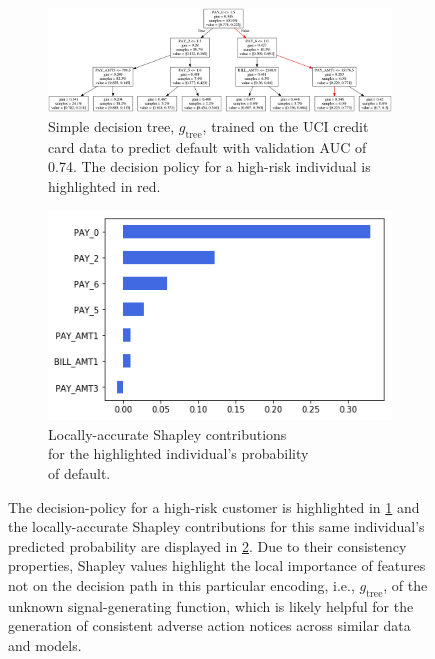 \documentclass{article}
\begin{document}
\begin{figure}[ht!]
	\begin{subfigure}{.6\textwidth}
		\includegraphics[height=.45\linewidth, width=1.15\linewidth]{img/dt.png}
  		\caption{Simple decision tree, $g_{\text{tree}}$, trained on the UCI credit card data to predict default with validation AUC of 0.74. The decision policy for a high-risk individual is highlighted in red.}
  		\label{fig:dt}
	\end{subfigure}\hspace{50pt}
	\begin{subfigure}{.4\textwidth}
		\vspace{22pt}
  		\includegraphics[height=.5\linewidth, width=.8\linewidth]{img/shap.png}
  		\vspace{5pt}
  		\caption{Locally-accurate Shapley contributions\\ for the highlighted individual's probability\\ of default.}
  		\label{fig:shap}
	\end{subfigure}
	\caption{The decision-policy for a high-risk customer is highlighted in \ref{fig:dt} and the locally-accurate Shapley contributions for this same individual's predicted probability are displayed in \ref{fig:shap}. Due to their consistency properties, Shapley values highlight the local importance of features not on the decision path in this particular encoding, i.e., $g_{\text{tree}}$, of the unknown signal-generating function, which is likely helpful for the generation of consistent adverse action notices across similar data and models.}
	\label{fig:dt_shap}
\end{figure}
\end{document}
